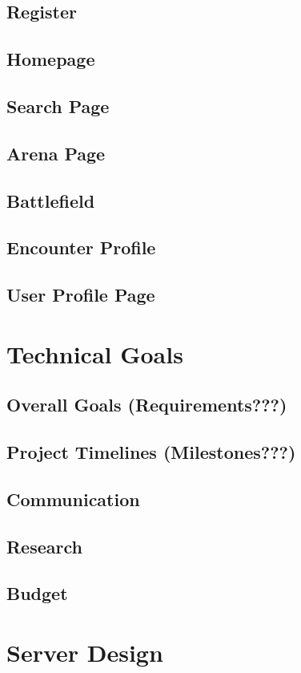 \documentclass[12pt,a4paper]{report}
\begin{document}
		\subsection{Register}
		\subsection{Homepage}
		\subsection{Search Page}
		\subsection{Arena Page}
		\subsection{Battlefield}
		\subsection{Encounter Profile}
		\subsection{User Profile Page}
	
	\section{Technical Goals}
		\subsection{Overall Goals (Requirements???)}
		\subsection{Project Timelines (Milestones???)}
		\subsection{Communication}
		\subsection{Research}
		\subsection{Budget}
	
	\section{Server Design}
\end{document}
